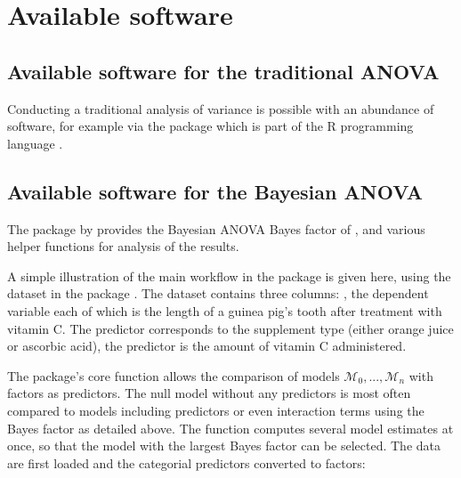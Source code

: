 

\section{Available software}
\subsection{Available software for the traditional ANOVA}
Conducting a traditional analysis of variance is possible with an abundance of software, for example via the  package \citep{RProgrammingLanguage} which is part of the R programming language \citep{RProgrammingLanguage}.

\subsection{Available software for the Bayesian ANOVA}
The  package by \cite{BayesFactorPackage} provides the Bayesian ANOVA Bayes factor of \cite{Rouder2012}, and various helper functions for analysis of the results. 

A simple illustration of the main workflow in the  package is given here, using the  dataset in the  package \citep{Stat2DataRPackage}. The  dataset contains three columns: , the dependent variable each of which is the length of a guinea pig's tooth after treatment with vitamin C. The predictor  corresponds to the supplement type (either orange juice or ascorbic acid), the predictor  is the amount of vitamin C administered.

The  package's core function allows the comparison of models $\mathcal{M}_0,...,\mathcal{M}_n$ with factors as predictors. The null model without any predictors is most often compared to models including predictors or even interaction terms using the Bayes factor as detailed above. The function  computes several model estimates at once, so that the model with the largest Bayes factor can be selected. The data are first loaded and the categorial predictors converted to factors:


